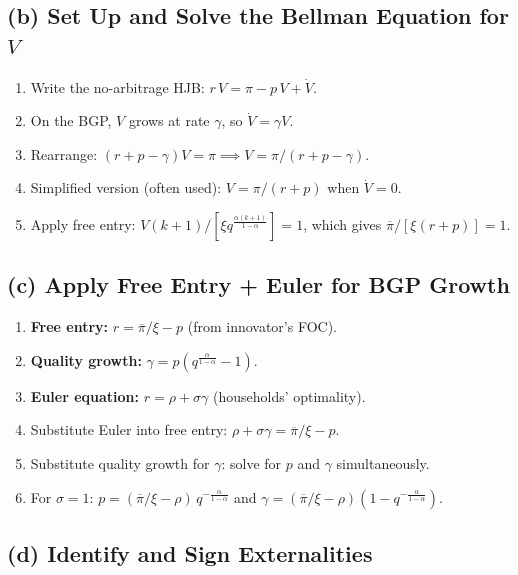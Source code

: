 \documentclass[a4paper,11pt]{article}
\newcommand{\pibar}{\overline{\pi}}
\begin{document}
\subsection*{(b) Set Up and Solve the Bellman Equation for $V$}

\begin{enumerate}
    \item Write the no-arbitrage HJB: $r\,V = \pi - p\,V + \dot{V}$.
    \item On the BGP, $V$ grows at rate $\gamma$, so $\dot{V} = \gamma V$.
    \item Rearrange: $(r + p - \gamma) V = \pi \implies V = \pi/(r + p - \gamma)$.
    \item Simplified version (often used): $V = \pi/(r + p)$ when $\dot{V} = 0$.
    \item Apply free entry: $V(k+1)/[\xi q^{\frac{\alpha(k+1)}{1-\alpha}}] = 1$, which gives $\pibar/[\xi(r+p)] = 1$.
\end{enumerate}

\subsection*{(c) Apply Free Entry + Euler for BGP Growth}

\begin{enumerate}
    \item \textbf{Free entry:} $r = \pibar/\xi - p$ (from innovator's FOC).
    \item \textbf{Quality growth:} $\gamma = p(q^{\frac{\alpha}{1-\alpha}} - 1)$.
    \item \textbf{Euler equation:} $r = \rho + \sigma\gamma$ (households' optimality).
    \item Substitute Euler into free entry: $\rho + \sigma\gamma = \pibar/\xi - p$.
    \item Substitute quality growth for $\gamma$: solve for $p$ and $\gamma$ simultaneously.
    \item For $\sigma = 1$: $p = (\pibar/\xi - \rho)\, q^{-\frac{\alpha}{1-\alpha}}$ and $\gamma = (\pibar/\xi - \rho)(1 - q^{-\frac{\alpha}{1-\alpha}})$.
\end{enumerate}

\subsection*{(d) Identify and Sign Externalities}
\end{document}
